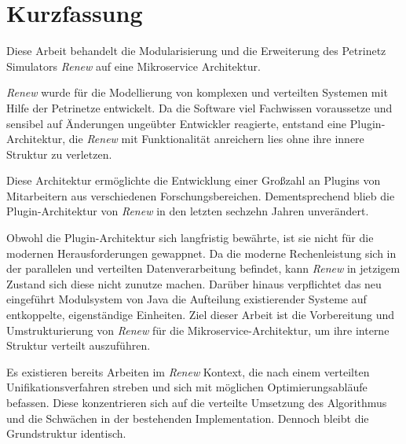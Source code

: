 



\newpage

\chapter*{Kurzfassung}
Diese Arbeit behandelt die Modularisierung und die Erweiterung des Petrinetz Simulators \textit{Renew} auf eine Mikroservice Architektur.

\textit{Renew} wurde für die Modellierung von komplexen und verteilten Systemen mit Hilfe der Petrinetze entwickelt. Da die Software viel Fachwissen voraussetze und sensibel auf Änderungen ungeübter Entwickler reagierte, entstand eine Plugin-Architektur, die \textit{Renew} mit Funktionalität anreichern lies ohne ihre innere Struktur zu verletzen. 

Diese Architektur ermöglichte die Entwicklung einer Großzahl an Plugins von Mitarbeitern aus verschiedenen Forschungsbereichen.
Dementsprechend blieb die Plugin-Architektur von \textit{Renew} in den letzten sechzehn Jahren unverändert. \bigbreak

Obwohl die Plugin-Architektur sich langfristig bewährte, ist sie nicht für die modernen Herausforderungen gewappnet. Da die moderne Rechenleistung sich in der parallelen und verteilten Datenverarbeitung befindet, kann \textit{Renew} in jetzigem Zustand sich diese nicht zunutze machen. Darüber hinaus verpflichtet das neu eingeführt Modulsystem von Java die Aufteilung existierender Systeme auf entkoppelte, eigenständige Einheiten. Ziel dieser Arbeit ist die Vorbereitung und Umstrukturierung von \textit{Renew} für die Mikroservice-Architektur, um ihre interne Struktur verteilt auszuführen.\bigbreak

Es existieren bereits Arbeiten im \textit{Renew} Kontext, die nach einem verteilten Unifikationsverfahren streben und sich mit möglichen Optimierungsabläufe befassen.
Diese konzentrieren sich auf die verteilte Umsetzung des Algorithmus und die Schwächen in der bestehenden Implementation. Dennoch bleibt die Grundstruktur identisch. \bigbreak

